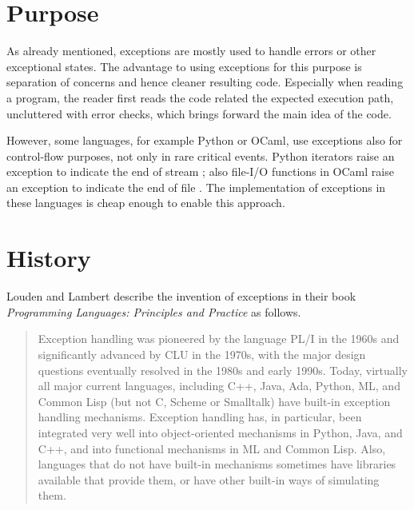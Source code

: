 
\section{Purpose}

As already mentioned, exceptions are mostly used to handle errors or other exceptional
states. The advantage to using
exceptions for this purpose is separation of concerns and hence cleaner resulting code.
Especially when reading a program, the reader first reads the code related the expected
execution path, uncluttered with error checks, which brings forward the main idea
of the code.

However, some languages, for example Python or OCaml, use exceptions also for control-flow
purposes, not only in rare critical events. Python iterators raise an exception to
indicate the end of stream \cite{python:reference}; also file-I/O functions in OCaml raise
an exception to indicate the end of file \cite{ocaml:reference}. The implementation of
exceptions in these languages is cheap enough to enable this approach.


\section{History}

Louden and Lambert describe the invention of exceptions in their book
\emph{Programming Languages: Principles and Practice} as follows.

\begin{quote}
Exception handling was pioneered by the language PL/I in the 1960s and
significantly advanced by CLU in the 1970s, with the major design questions
eventually resolved in the 1980s and early 1990s. Today, virtually all major
current languages, including C++, Java, Ada, Python, ML, and Common Lisp (but
not C, Scheme or Smalltalk) have built-in exception handling mechanisms.
Exception handling has, in particular, been integrated very well into
object-oriented mechanisms in Python, Java, and C++, and into functional
mechanisms in ML and Common Lisp. Also, languages that do not have built-in
mechanisms sometimes have libraries available that provide them, or have other
built-in ways of simulating them. \cite[p.~423]{louden:languages}
\end{quote}


